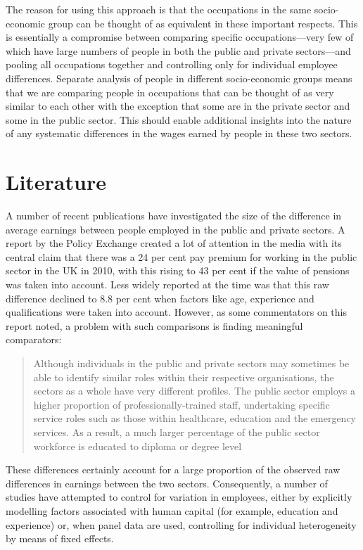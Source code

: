 \documentclass[a4paper,11pt,titlepage]{article}
\begin{document}
 The reason for using this approach is that the occupations in the same socio-economic group can be thought of as equivalent in these important respects. This is essentially a compromise between comparing specific occupations---very few of which have large numbers of people in both the public and private sectors---and pooling all occupations together and controlling only for individual employee differences.  Separate analysis of people in different socio-economic groups means that we are comparing people in occupations that can be thought of as very similar to each other with the exception that some are in the private sector and some in the public sector. This should enable additional insights into the nature of any systematic differences in the wages earned by people in these two sectors.

\section{Literature}
A number of recent publications have investigated the size of the difference in average earnings between people employed in the public and private sectors.  A report by the Policy Exchange \citep{Holmes2011} created a lot of attention in the media with its central claim that there was a 24 per cent pay premium for working in the public sector in the UK in 2010, with this rising to 43 per cent if the value of pensions was taken into account.  Less widely reported at the time was that this raw difference declined to 8.8 per cent when factors like age, experience and qualifications were taken into account.  However, as some commentators on this report noted, a problem with such comparisons is finding meaningful comparators:
\begin{quote}
    Although individuals in the public and private sectors may sometimes be able to identify similar roles within their respective organisations, the sectors as a whole have very different profiles. The public sector employs a higher proportion of professionally-trained staff, undertaking specific service roles such as those within healthcare, education and the emergency services. As a result, a much larger percentage of the public sector workforce is educated to diploma or degree level \citep[p.~13]{IDS2011}
\end{quote}
These differences certainly account for a large proportion of the observed raw differences in earnings between the two sectors.  Consequently, a number of studies have attempted to control for variation in employees, either by explicitly modelling factors associated with human capital (for example, education and experience) or, when panel data are used, controlling for individual heterogeneity by means of fixed effects.
\end{document}
